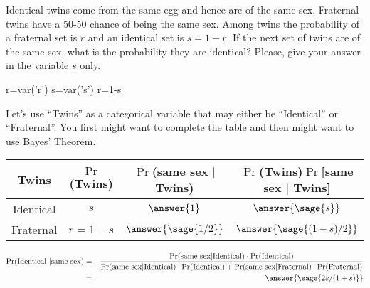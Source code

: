 \documentclass{ximera}
\begin{document}
\begin{problem}

Identical twins come from the same egg and hence are of the same sex. Fraternal twins have a 50-50 chance of being the same sex. Among twins the probability of a fraternal set is $r$ and an identical set is $s = 1 - r$. If the next set of twins are of the same sex, what is the probability they are identical? Please, give your answer in the variable $s$ only.
\begin{sagesilent}
r=var('r')
s=var('s')
r=1-s
\end{sagesilent}
\begin{hint}
Let's use ``Twins'' as a categorical variable that may either be ``Identical'' or ``Fraternal''. You first might want to complete the table and then might want to use Bayes' Theorem. 
\end{hint}

\begin{prompt}
\begin{tabular}{c|c|c|c}
Twins &	$\Pr$(Twins) &	$\Pr$(same sex $|$ Twins)&	$\Pr$(Twins)$\Pr$[same sex $|$ Twins] \\
\hline
Identical &	$s$ &	$\answer{1}$ &	$\answer{\sage{s}}$ \\
\hline
Fraternal &	$r=1-s$	& $\answer{\sage{1/2}}$ &	$\answer{\sage{(1-s)/2}}$ 
\end{tabular}

\begin{eqnarray*} 
\Pr(\text{Identical } | \text{same sex}) &=& \frac{\Pr(\text{same sex}|\text{Identical} )\cdot \Pr(\text{Identical})} {\Pr(\text{same sex}|\text{Identical})\cdot \Pr(\text{Identical})+\Pr(\text{same sex}|\text{Fraternal})\cdot\Pr(\text{Fraternal})} \\ 
&=&%
\answer{\sage{2s/(1+s)}}\\ 
\end{eqnarray*}
\end{prompt}
\end{problem}
\end{document}

